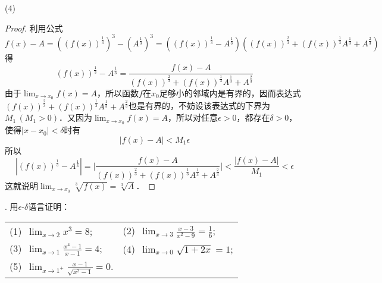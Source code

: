 \noindent(4)
\begin{proof}
利用公式
\begin{equation}
    f(x) - A = ((f(x))^\frac{1}{3})^3 - (A^\frac{1}{3})^3 = ((f(x))^\frac{1}{3}-A^\frac{1}{3})((f(x))^{\frac{2}{3}} + (f(x))^\frac{1}{3} A^\frac{1}{3} + A^\frac{2}{3})
\end{equation}
得
\begin{equation}
    (f(x))^\frac{1}{3}-A^\frac{1}{3} = \frac{f(x) - A}{(f(x))^{\frac{2}{3}} + (f(x))^\frac{1}{3} A^\frac{1}{3} + A^\frac{2}{3}}
\end{equation}
由于$\displaystyle\lim_{x \to x_0} f(x) = A$，所以函数$f$在$x_0$足够小的邻域内是有界的，因而表达式$(f(x))^{\frac{2}{3}} + (f(x))^\frac{1}{3} A^\frac{1}{3} + A^\frac{2}{3}$也是有界的，不妨设该表达式的下界为$M_1 \, (M_1 > 0)$．又因为$\displaystyle\lim_{x \to x_0} f(x) = A$，所以对任意$\epsilon > 0$，都存在$\delta > 0$，使得$|x - x_0| < \delta$时有
\begin{equation}
    |f(x) - A| < M_1 \epsilon
\end{equation}
所以
\begin{equation}
    |(f(x))^\frac{1}{3}-A^\frac{1}{3}| = \bigg\lvert \frac{f(x) - A}{(f(x))^{\frac{2}{3}} + (f(x))^\frac{1}{3} A^\frac{1}{3} + A^\frac{2}{3}} \bigg\rvert < \frac{|f(x)-A|}{M_1} < \epsilon
\end{equation}
这就说明$\displaystyle\lim_{x \to x_0} \sqrt[3]{f(x)} = \sqrt[3]{A}$．
\end{proof}

. 用$\epsilon$-$\delta$语言证明：
\begin{table}[H]
    \centering
    \begin{tabularx}{0.8\textwidth} {  >{\raggedright\arraybackslash}X >{\raggedright\arraybackslash}X  }
       (1)~$\displaystyle\lim_{x \to 2} x^3 = 8$; & (2)~$\displaystyle\lim_{x \to 3} \frac{x-3}{x^2-9} = \frac{1}{6}$; \\ [1em]
       (3)~$\displaystyle\lim_{x \to 1} \displaystyle\frac{x^4-1}{x-1} = 4$; & (4)~$\displaystyle\lim_{x \to 0} \sqrt{1+2x} = 1$; \\ [1em]
       (5)~$\displaystyle\lim_{x \to 1^{+}} \displaystyle\frac{x-1}{\sqrt{x^2-1}} = 0$.
      \end{tabularx}
\end{table}


